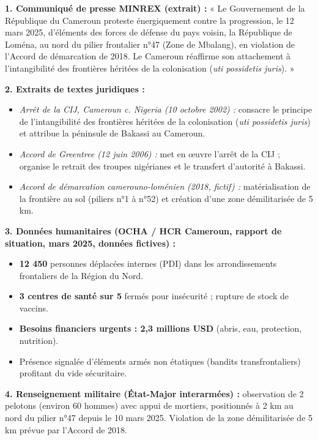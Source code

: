 \documentclass[11pt]{article}
\begin{document}
\begin{exemplebox}
\textbf{1. Communiqué de presse MINREX (extrait) :} « Le Gouvernement de la République du Cameroun proteste énergiquement contre la progression, le 12 mars 2025, d'éléments des forces de défense du pays voisin, la République de Loména, au nord du pilier frontalier n°47 (Zone de Mbalang), en violation de l'Accord de démarcation de 2018. Le Cameroun réaffirme son attachement à l'intangibilité des frontières héritées de la colonisation (\emph{uti possidetis juris}). »

\textbf{2. Extraits de textes juridiques :}
\begin{itemize}
    \item \emph{Arrêt de la CIJ, Cameroun c. Nigeria (10 octobre 2002) :} consacre le principe de l'intangibilité des frontières héritées de la colonisation (\emph{uti possidetis juris}) et attribue la péninsule de Bakassi au Cameroun.
    \item \emph{Accord de Greentree (12 juin 2006) :} met en œuvre l'arrêt de la CIJ ; organise le retrait des troupes nigérianes et le transfert d'autorité à Bakassi.
    \item \emph{Accord de démarcation camerouno-loménien (2018, fictif) :} matérialisation de la frontière au sol (piliers n°1 à n°52) et création d'une zone démilitarisée de 5 km.
\end{itemize}

\textbf{3. Données humanitaires (OCHA / HCR Cameroun, rapport de situation, mars 2025, données fictives) :}
\begin{itemize}
    \item \textbf{12 450} personnes déplacées internes (PDI) dans les arrondissements frontaliers de la Région du Nord.
    \item \textbf{3 centres de santé sur 5} fermés pour insécurité ; rupture de stock de vaccins.
    \item \textbf{Besoins financiers urgents : 2,3 millions USD} (abris, eau, protection, nutrition).
    \item Présence signalée d'éléments armés non étatiques (bandits transfrontaliers) profitant du vide sécuritaire.
\end{itemize}

\textbf{4. Renseignement militaire (État-Major interarmées) :} observation de 2 pelotons (environ 60 hommes) avec appui de mortiers, positionnés à 2 km au nord du pilier n°47 depuis le 10 mars 2025. Violation de la zone démilitarisée de 5 km prévue par l'Accord de 2018.
\end{exemplebox}
\end{document}
